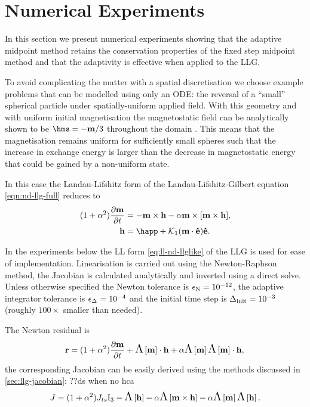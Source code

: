 \section{Numerical Experiments}
\label{sec:imr-ode-llg-numer-exper}

In this section we present numerical experiments showing that the adaptive midpoint method retains the conservation properties of the fixed step midpoint method and that the adaptivity is effective when applied to the LLG.

To avoid complicating the matter with a spatial discretisation we choose example problems that can be modelled using only an ODE: the reversal of a ``small'' spherical particle under spatially-uniform applied field.
With this geometry and with uniform initial magnetisation the magnetostatic field can be analytically shown to be $\hms = -\mv/3$ throughout the domain \cite[112]{Aharoni1996}.
This means that the magnetisation remains uniform for sufficiently small spheres such that the increase in exchange energy is larger than the decrease in magnetostatic energy that could be gained by a non-uniform state.

In this case the Landau-Lifshitz form of the Landau-Lifshitz-Gilbert equation \eqref{eqn:nd-llg-full} reduces to
\begin{equation}
  \begin{aligned}
    (1 + \dampc^2) \dmdt &= - \mv \times \hv - \dampc \mv \times \bigs{\mv \times \hv}, \\
    \hv &= \happ + \kone (\mv \cdot \ev) \ev.
    \label{eqn:nd-ode-llg}
  \end{aligned}
\end{equation}


In the experiments below the LL form \eqref{eq:ll-nd-llglike} of the LLG is used for ease of implementation.
Linearisation is carried out using the Newton-Raphson method, the Jacobian is calculated analytically and inverted using a direct solve.
Unless otherwise specified the Newton tolerance is $\epsilon_{\text{N}} = 10^{-12}$, the adaptive integrator tolerance is $\epsilon_{\Delta_{}} = 10^{-4}$ and the initial time step is $\Delta_{\text{init}} = 10^{-3}$ (roughly $100\times$ smaller than needed).

The Newton residual is
\begin{equation}
  \mathbf{r} = (1 + \alpha^2) \frac{\partial \mathbf{m}}{\partial t} + \text{\Large{$\Lambda$}}\left[ \mathbf{m} \right] \cdot \mathbf{h} + \alpha \text{\Large{$\Lambda$}}\left[ \mathbf{m} \right]\text{\Large{$\Lambda$}}\left[ \mathbf{m} \right] \cdot \mathbf{h}, \\
\end{equation}
the corresponding Jacobian can be easily derived using the methods discussed in \autoref{sec:llg-jacobian}: ??ds when no hca
\begin{equation}
  J = (1 + \alpha^2) J_{ts} \mathrm{I}_3 - \text{\Large{$\Lambda$}}\left[ \mathbf{h} \right] - \alpha \text{\Large{$\Lambda$}}\left[  \mathbf{m} \times \mathbf{h}  \right]
  - \alpha \text{\Large{$\Lambda$}}\left[ \mathbf{m} \right] \text{\Large{$\Lambda$}}\left[ \mathbf{h} \right].
\end{equation}


